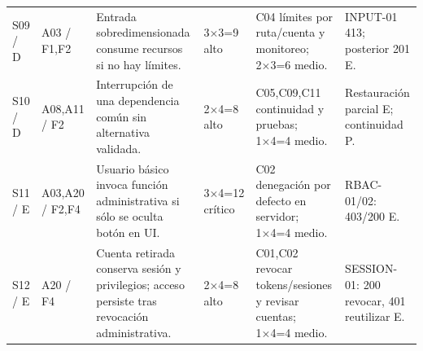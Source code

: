 \documentclass[10pt,a4paper]{article}
\begin{document}
\begin{PaginaApaisada}
\begin{TablaCompacta}
\begin{longtable}{P{12mm}P{27mm}P{58mm}P{31mm}P{62mm}P{33mm}}
S09 / D & A03 / F1,F2 & Entrada sobredimensionada consume recursos si no hay límites. & 3×3=9 alto & C04 límites por ruta/cuenta y monitoreo; 2×3=6 medio. & INPUT-01 413; posterior 201 E.\\
S10 / D & A08,A11 / F2 & Interrupción de una dependencia común sin alternativa validada. & 2×4=8 alto & C05,C09,C11 continuidad y pruebas; 1×4=4 medio. & Restauración parcial E; continuidad P.\\
S11 / E & A03,A20 / F2,F4 & Usuario básico invoca función administrativa si sólo se oculta botón en UI. & 3×4=12 crítico & C02 denegación por defecto en servidor; 1×4=4 medio. & RBAC-01/02: 403/200 E.\\
S12 / E & A20 / F4 & Cuenta retirada conserva sesión y privilegios; acceso persiste tras revocación administrativa. & 2×4=8 alto & C01,C02 revocar tokens/sesiones y revisar cuentas; 1×4=4 medio. & SESSION-01: 200 revocar, 401 reutilizar E.\\\bottomrule
\end{longtable}
\end{TablaCompacta}
\end{PaginaApaisada}
\end{document}
